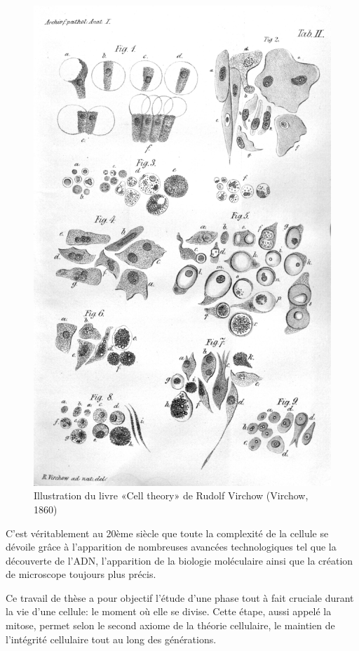 \documentclass[12pt,a4paper,twoside,openright]{book}
\begin{document}
\begin{figure}[htbp]
\centering
\includegraphics{figures/intro/virchow.jpg}
\caption{Illustration du livre «Cell theory» de Rudolf Virchow (Virchow,
1860)\label{virchow}}
\end{figure}

C'est véritablement au 20ème siècle que toute la complexité de la
cellule se dévoile grâce à l'apparition de nombreuses avancées
technologiques tel que la découverte de l'ADN, l'apparition de la
biologie moléculaire ainsi que la création de microscope toujours plus
précis.

Ce travail de thèse a pour objectif l'étude d'une phase tout à fait
cruciale durant la vie d'une cellule: le moment où elle se divise. Cette
étape, aussi appelé la mitose, permet selon le second axiome de la
théorie cellulaire, le maintien de l'intégrité cellulaire tout au long
des générations.
\end{document}
